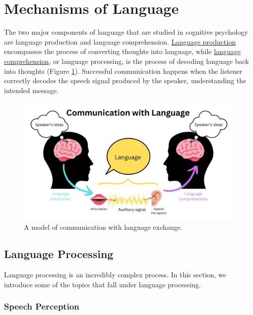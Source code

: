 \documentclass[
]{krantz}
\begin{document}
\hypertarget{mechanisms-of-language}{%
\section{Mechanisms of Language}\label{mechanisms-of-language}}

The two major components of language that are studied in cognitive psychology are language production and language comprehension. \protect\hyperlink{langproddef}{Language production} encompasses the process of converting thoughts into language, while \protect\hyperlink{language-comprehension}{language comprehension}, or language processing, is the process of decoding language back into thoughts (Figure \ref{fig:model}). Successful communication happens when the listener correctly decodes the speech signal produced by the speaker, understanding the intended message.

\begin{figure}

{\centering \includegraphics[width=0.8\linewidth]{images/ch8/model_of_language_draft} 

}

\caption{A model of communication with language exchange.}\label{fig:model}
\end{figure}

\hypertarget{language-processing}{%
\subsection*{Language Processing}\label{language-processing}}


Language processing is an incredibly complex process. In this section, we introduce some of the topics that fall under language processing.

\hypertarget{speech-perception}{%
\subsubsection*{Speech Perception}\label{speech-perception}}
\end{document}
